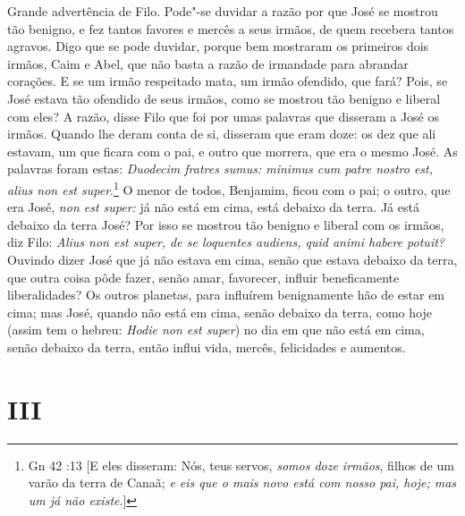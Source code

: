 Grande advertência de Filo. Pode"-se duvidar a razão por que José se
mostrou tão benigno, e fez tantos favores e mercês a seus irmãos, de
quem recebera tantos agravos. Digo que se pode duvidar, porque bem
mostraram os primeiros dois irmãos, Caim e Abel, que não basta a razão
de irmandade para abrandar corações. E se um irmão respeitado mata, um
irmão ofendido, que fará? Pois, se José estava tão ofendido de seus
irmãos, como se mostrou tão benigno e liberal com eles? A razão, disse
Filo que foi por umas palavras que disseram a José os irmãos. Quando lhe
deram conta de si, disseram que eram doze: os dez que ali estavam, um
que ficara com o pai, e outro que morrera, que era o mesmo José. As
palavras foram estas: \emph{Duodecim fratres sumus: minimus cum patre
nostro est, alius non est super}.\footnote{Gn 42 :13 [E eles disseram: Nós, teus servos, \textit{somos doze irmãos}, filhos de um varão da terra de Canaã; \textit{e eis que o mais novo está com nosso pai, hoje; mas um já não existe}.]} O menor de todos, Benjamim,
ficou com o pai; o outro, que era José, \emph{non est super:} já não
está em cima, está debaixo da terra. Já está debaixo da terra José?
Por isso se mostrou tão benigno e liberal com os irmãos, diz Filo:
\emph{Alius non est super, de se loquentes audiens, quid animi habere
potuit?} Ouvindo dizer José que já não estava em cima, senão que
estava debaixo da terra, que outra coisa pôde fazer, senão amar,
favorecer, influir beneficamente liberalidades? Os outros planetas, para
influírem benignamente hão de estar em cima; mas José, quando não está
em cima, senão debaixo da terra, como hoje (assim tem o hebreu:
\emph{Hodie non est super}) no dia em que não está em cima, senão
debaixo da terra, então influi vida, mercês, felicidades e aumentos.

\section*{III}

